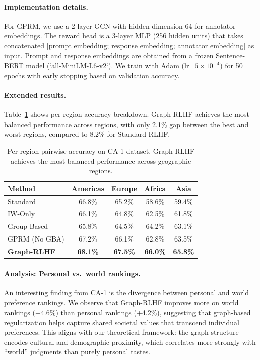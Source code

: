 \documentclass{article}
\theoremstyle{plain}
\theoremstyle{definition}
\theoremstyle{remark}
\begin{document}
\paragraph{Implementation details.}
For GPRM, we use a 2-layer GCN with hidden dimension 64 for annotator embeddings. The reward head is a 3-layer MLP (256 hidden units) that takes concatenated [prompt embedding; response embedding; annotator embedding] as input. Prompt and response embeddings are obtained from a frozen Sentence-BERT model (`all-MiniLM-L6-v2`). We train with Adam (lr=$5 \times 10^{-4}$) for 50 epochs with early stopping based on validation accuracy.

\paragraph{Extended results.}
Table~\ref{tab:ca1-extended} shows per-region accuracy breakdown. Graph-RLHF achieves the most balanced performance across regions, with only 2.1\% gap between the best and worst regions, compared to 8.2\% for Standard RLHF.

\begin{table}[h]
\caption{Per-region pairwise accuracy on CA-1 dataset. Graph-RLHF achieves the most balanced performance across geographic regions.}
\label{tab:ca1-extended}
\centering
\small
\begin{tabular}{lcccc}
\toprule
\textbf{Method} & \textbf{Americas} & \textbf{Europe} & \textbf{Africa} & \textbf{Asia} \\
\midrule
Standard & 66.8\% & 65.2\% & 58.6\% & 59.4\% \\
IW-Only & 66.1\% & 64.8\% & 62.5\% & 61.8\% \\
Group-Based & 65.8\% & 64.5\% & 64.2\% & 63.1\% \\
GPRM (No GBA) & 67.2\% & 66.1\% & 62.8\% & 63.5\% \\
\textbf{Graph-RLHF} & \textbf{68.1\%} & \textbf{67.5\%} & \textbf{66.0\%} & \textbf{65.8\%} \\
\bottomrule
\end{tabular}
\end{table}

\paragraph{Analysis: Personal vs.\ world rankings.}
An interesting finding from CA-1 is the divergence between personal and world preference rankings. We observe that Graph-RLHF improves more on world rankings (+4.6\%) than personal rankings (+4.2\%), suggesting that graph-based regularization helps capture shared societal values that transcend individual preferences. This aligns with our theoretical framework: the graph structure encodes cultural and demographic proximity, which correlates more strongly with ``world'' judgments than purely personal tastes.
\end{document}

